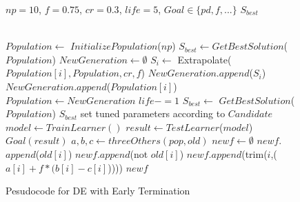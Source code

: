 \documentclass[12pt, journal, onecolumn]{IEEEtran}
\begin{document}
\begin{figure}[h!]
  \centering
  \begin{minipage}{0.5\linewidth}
  \renewcommand{\baselinestretch}{0.8}\begin{center}\scriptsize
  \begin{algorithmic}[1]
    \Require $\mathit{np} = 10$, $f=0.75$, $cr=0.3$, $\mathit{life} = 5$, $\mathit{Goal} \in \{\mathit{pd},f,...\}$
    \Ensure $S_{best}$
    
    ~\\
    \State $Population  \gets $ $InitializePopulation$($\mathit{np}$)   
    \State $S_{best} \gets $$GetBestSolution$($Population $)
    \State $NewGeneration \gets \emptyset$
    \State $S_i \gets$ Extrapolate($Population [i], Population , cr, f$)
    \State $NewGeneration$.$append$($S_i$)
    \Else
    \State $NewGeneration$.$append$($Population [i]$)
    \EndIf
    \EndFor
    \State $Population  \gets NewGeneration$
    \State $life -=1$
    \EndIf
    \State $S_{best} \gets$ $GetBestSolution$($Population $)
    \EndWhile
    \State \Return $S_{best}$
    \EndFunction
    \State set tuned parameters according to $Candidate$
    \State $model \gets$$TrainLearner()$
    \State $result \gets$$TestLearner$($model$)   
    \State \Return$\mathit{Goal}(result)$  
    \EndFunction
    \State $a, b, c\gets threeOthers(pop,old)$  
    \State $newf \gets \emptyset$
    \State $newf$.$append$($old[i]$)
    \Else
    \State $newf$.$append$(not $old[i]$)
    \Else
    \State $newf$.$append$(trim($i$,($a[i] + f * (b[i] - c[i]$)))) 
    \EndIf
    \EndIf
    \EndFor
    \State \Return $newf$
    \EndFunction
  \end{algorithmic} 
  \caption{Pesudocode for DE with Early Termination}
  \label{alg:DE}
\end{center}
\end{minipage}
\end{figure}
\end{document}
